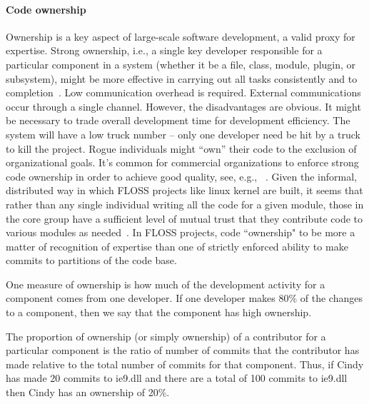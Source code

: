 \documentclass{sig-alternate-05-2015}
\begin{document}
\paragraph{Code ownership}
Ownership is a key aspect of large-scale software development,
 a valid proxy for expertise. Strong ownership, i.e.,
 a single key developer responsible for a particular component in a system (whether
it be a file, class, module, plugin, or subsystem), might be more
effective in carrying out all tasks consistently
and to completion~\cite{nordberg03}.
 Low communication overhead is required. External communications occur
through a single channel.
However, the disadvantages are obvious.
It might be necessary to trade overall development time for development
efficiency.  The system will have a low truck number -- only one developer
need be hit by a truck to kill the project.
 Rogue individuals might ``own'' their code
to the exclusion of organizational goals.
It's common for commercial organizations to enforce strong code
ownership in order to achieve good quality, see, e.g., ~\cite{bird11}.
Given the informal, distributed way in which FLOSS projects like linux kernel are built,
it seems that rather than
any single individual writing all the code for a given module, those in the core group
have a sufficient level of mutual trust that they contribute code to various modules as
needed~\cite{MFH02}. In FLOSS projects, code ``ownership" to be
more a matter of recognition of expertise than one of strictly enforced ability to make
commits to partitions of the code base.

One measure of ownership
is how much  of  the  development  activity  for  a  component
comes from one developer. If one developer makes 80\% of
the changes to a component, then we say that the component has high
ownership.

  The proportion of ownership  (or  simply  ownership)  of  a  contributor  for  a
particular component is the ratio of number of commits that the contributor has made
relative to the total number of commits for that component.  Thus, if
Cindy has made 20 commits to ie9.dll and there are
a total of 100 commits to ie9.dll then Cindy has an ownership of 20\%.

\end{document}
